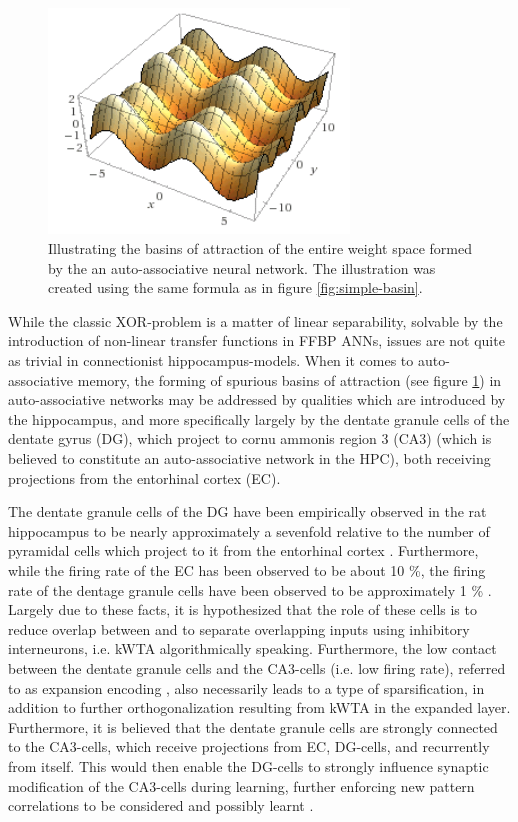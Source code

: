 \begin{figure}
    \centering
    \includegraphics[width=8cm]{fig/whole-view-simple-basins.png}
    \caption{Illustrating the basins of attraction of the entire weight space formed by the an auto-associative neural network. The illustration was created using the same formula as in figure \ref{fig:simple-basin}.}
    \label{fig:basins-of-attraction}
\end{figure}

While the classic XOR-problem is a matter of linear separability, solvable by the introduction of non-linear transfer functions in FFBP ANNs, issues are not quite as trivial in connectionist hippocampus-models. When it comes to auto-associative memory, the forming of spurious basins of attraction (see figure \ref{fig:basins-of-attraction}) in auto-associative networks may be addressed by qualities which are introduced by the hippocampus, and more specifically largely by the dentate granule cells of the dentate gyrus (DG), which project to cornu ammonis region 3 (CA3) (which is believed to constitute an auto-associative network in the HPC), both receiving projections from the entorhinal cortex (EC).

The dentate granule cells of the DG have been empirically observed in the rat hippocampus to be nearly approximately a sevenfold relative to the number of pyramidal cells which project to it from the entorhinal cortex \citep{Rolls1998chpt6}. Furthermore, while the firing rate of the EC has been observed to be about 10 \%, the firing rate of the dentage granule cells have been observed to be approximately 1 \% \citep{Rolls1998chpt6}.
Largely due to these facts, it is hypothesized that the role of these cells is to reduce overlap between and to separate overlapping inputs using inhibitory interneurons, i.e. kWTA algorithmically speaking. Furthermore, the low contact between the dentate granule cells and the CA3-cells (i.e. low firing rate), referred to as expansion encoding \citep{Rolls1998chpt6}, also necessarily leads to a type of sparsification, in addition to further orthogonalization resulting from kWTA in the expanded layer. Furthermore, it is believed that the dentate granule cells are strongly connected to the CA3-cells, which receive projections from EC, DG-cells, and recurrently from itself. This would then enable the DG-cells to strongly influence synaptic modification of the CA3-cells during learning, further enforcing new pattern correlations to be considered and possibly learnt \citep{Rolls1998chpt6}.

